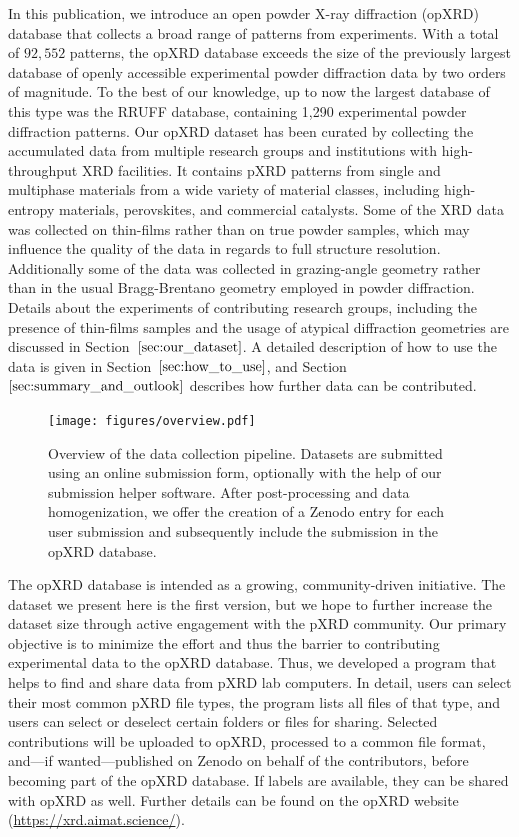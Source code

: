 In this publication, we introduce an open powder X-ray diffraction (opXRD) database that collects a broad range of patterns from experiments. With a total of $92,552$ patterns, the opXRD database exceeds the size of the previously largest database of openly accessible experimental powder diffraction data by two orders of magnitude. To the best of our knowledge, up to now the largest database of this type was the RRUFF database, containing 1,290 experimental powder diffraction patterns. Our opXRD dataset has been curated by collecting the accumulated data from multiple research groups and institutions with high-throughput XRD facilities. It contains pXRD patterns from single and multiphase materials from a wide variety of material classes, including high-entropy materials, perovskites, and commercial catalysts. Some of the XRD data was collected on thin-films rather than on true powder samples, which may influence the quality of the data in regards to full structure resolution. Additionally some of the data was collected in grazing-angle geometry rather than in the usual Bragg-Brentano geometry employed in powder diffraction. Details about the experiments of contributing research groups, including the presence of thin-films samples and the usage of atypical diffraction geometries are discussed in Section~$\eqref{sec:our_dataset}$. A detailed description of how to use the data is given in Section~$\eqref{sec:how_to_use}$, and Section~$\eqref{sec:summary_and_outlook}$ describes how further data can be contributed.

\begin{figure}[!htb]
    \centering
    \texttt{[image: figures/overview.pdf]}
    \caption{Overview of the data collection pipeline. Datasets are submitted using an online submission form, optionally with the help of our submission helper software. After post-processing and data homogenization, we offer the creation of a Zenodo entry for each user submission and subsequently include the submission in the opXRD database.}
    \label{fig:overview}
\end{figure}

The opXRD database is intended as a growing, community-driven initiative. The dataset we present here is the first version, but we hope to further increase the dataset size through active engagement with the pXRD community. Our primary objective is to minimize the effort and thus the barrier to contributing experimental data to the opXRD database. Thus, we developed a program that helps to find and share data from pXRD lab computers. In detail, users can select their most common pXRD file types, the program lists all files of that type, and users can select or deselect certain folders or files for sharing. Selected contributions will be uploaded to opXRD, processed to a common file format, and---if wanted---published on Zenodo on behalf of the contributors, before becoming part of the opXRD database. If labels are available, they can be shared with opXRD as well. Further details can be found on the opXRD website (\url{https://xrd.aimat.science/}). \\

